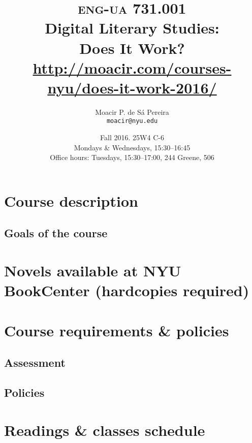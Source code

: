 \documentclass[10pt,article,oneside]{memoir}
\makeatletter
\def\myauthor{Author}
\def\mytitle{Title}
\def\myaddress{}
\def\myemail{}
\def\mycoursecode{}
\def\mycoursename{}
\def\mycoursetime{}
\def\mycourseurl{}
\def\myterm{}
\def\myofficehours{}
\def\mycoursecode{eng-ua 731.001}
\def\mycoursename{Digital Literary Studies:\\ Does It Work?}
\def\myterm{Fall 2016}
\def\myaddress{25W4 C-6}
\def\myemail{moacir@nyu.edu}
\def\myauthor{Moacir P. de Sá Pereira}
\def\mytitle{{\normalsize \textsc{\mycoursecode}\\} \HUGE \mycoursename}
\def\mycoursetime{Mondays \& Wednesdays, 15:30--16:45}
\def\mycourseurl{http://moacir.com/courses-nyu/does-it-work-2016/}
\def\myofficehours{Tuesdays, 15:30--17:00, 244 Greene, 506}
\makeatother
\begin{document}
 \setsansfont[Mapping=tex-text]{Helvetica} 
 \setmonofont[Mapping=tex-text,Scale=0.8]{DejaVu Sans Mono}

\title{\LARGE \mytitle \\ \Large\url{\mycourseurl}}     
\author{\Large\myauthor\\ \small\texttt{\noindent\myemail}}
\date{\myterm. \myaddress \\ \mycoursetime \\ \small Office hours: \myofficehours}

\maketitle


\section*{Course description}


\subsection*{Goals of the course}

     
\section*{Novels available at NYU BookCenter \small (hardcopies required)}

	
\section*{Course requirements \& policies}

  \subsection*{Assessment}
  

	\subsection*{Policies}
	

\newpage

\section*{Readings \& classes schedule}


\newpage


\newpage
\printbibliography 
\end{document}
